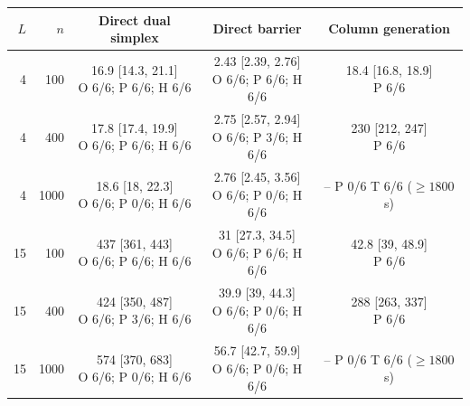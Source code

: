 \begin{table}[htbp]
\centering
\scriptsize
\setlength{\tabcolsep}{4pt}
\begin{tabular}{rrccc}
\hline
$L$ & $n$ & Direct dual simplex & Direct barrier & Column generation \\
\hline
4 & 100 & \shortstack{16.9 [14.3, 21.1]\\O 6/6; P 6/6; H 6/6} & \shortstack{2.43 [2.39, 2.76]\\O 6/6; P 6/6; H 6/6} & \shortstack{18.4 [16.8, 18.9]\\P 6/6} \\
4 & 400 & \shortstack{17.8 [17.4, 19.9]\\O 6/6; P 6/6; H 6/6} & \shortstack{2.75 [2.57, 2.94]\\O 6/6; P 3/6; H 6/6} & \shortstack{230 [212, 247]\\P 6/6} \\
4 & 1000 & \shortstack{18.6 [18, 22.3]\\O 6/6; P 0/6; H 6/6} & \shortstack{2.76 [2.45, 3.56]\\O 6/6; P 0/6; H 6/6} & \shortstack{--\\P 0/6\\T 6/6 ($\geq 1800$ s)} \\
15 & 100 & \shortstack{437 [361, 443]\\O 6/6; P 6/6; H 6/6} & \shortstack{31 [27.3, 34.5]\\O 6/6; P 6/6; H 6/6} & \shortstack{42.8 [39, 48.9]\\P 6/6} \\
15 & 400 & \shortstack{424 [350, 487]\\O 6/6; P 3/6; H 6/6} & \shortstack{39.9 [39, 44.3]\\O 6/6; P 0/6; H 6/6} & \shortstack{288 [263, 337]\\P 6/6} \\
15 & 1000 & \shortstack{574 [370, 683]\\O 6/6; P 0/6; H 6/6} & \shortstack{56.7 [42.7, 59.9]\\O 6/6; P 0/6; H 6/6} & \shortstack{--\\P 0/6\\T 6/6 ($\geq 1800$ s)} \\
\hline
\end{tabular}

\end{table}
